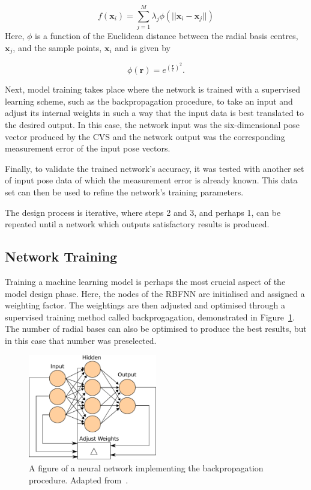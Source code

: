 \begin{equation}
  \label{eq:chap4-rbf}
  f(\bm{x}_i) = \sum\limits_{j = 1}^{M}\lambda_j \phi(|| \bm{x}_i - \bm{x}_j ||)
\end{equation}
Here, $\phi$ is a function of the Euclidean distance between the radial basis centres, $\bm{x}_j$, and the sample points, $\bm{x}_i$ and is given by 

\begin{equation}
  \phi(\bm{r}) = e^{(\frac{\bm{r}}{\epsilon})^2}.
\end{equation}

Next, model training takes place where the network is trained with a supervised learning scheme, such as the backpropagation procedure, to take an input and adjust its internal weights in such a way that the input data is best translated to the desired output. In this case, the network input was the six-dimensional pose vector produced by the CVS and the network output was the corresponding measurement error of the input pose vectors.  

Finally, to validate the trained network's accuracy, it was tested with another set of input pose data of which the measurement error is already known. This data set can then be used to refine the network's training parameters. 

The design process is iterative, where steps 2 and 3, and perhaps 1, can be repeated until a network which outputs satisfactory results is produced. 

\subsection{Network Training}

Training a machine learning model is perhaps the most crucial aspect of the model design phase. Here, the nodes of the RBFNN are initialised and assigned a weighting factor. The weightings are then adjusted and optimised through a supervised training method called backprogagation, demonstrated in Figure~\ref{fig:chap4-backprogagation}. The number of radial bases can also be optimised to produce the best results, but in this case that number was preselected. 

\begin{figure}
  \centering
  \includegraphics[width=0.5\textwidth]{figures/chapter4/backpropagation}
  \caption[Neural network implementing the backpropagation procedure.]{A figure of a neural network implementing the backpropagation procedure. Adapted from~\cite{ann-wiki-pic}.}
\label{fig:chap4-backprogagation}
\end{figure}


